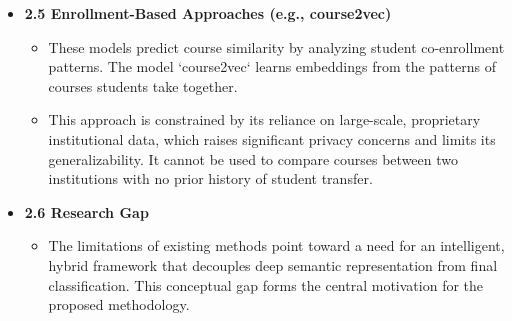 \documentclass[11pt]{article}
\begin{document}
\begin{itemize}
\begin{itemize}
    \end{itemize}
    \item \textbf{2.5 Enrollment-Based Approaches (e.g., course2vec)}
    \begin{itemize}
        \item These models predict course similarity by analyzing student co-enrollment patterns. The model `course2vec` learns embeddings from the patterns of courses students take together.
        \item This approach is constrained by its reliance on large-scale, proprietary institutional data, which raises significant privacy concerns and limits its generalizability. It cannot be used to compare courses between two institutions with no prior history of student transfer.
    \end{itemize}
    \item \textbf{2.6 Research Gap}
    \begin{itemize}
        \item The limitations of existing methods point toward a need for an intelligent, hybrid framework that decouples deep semantic representation from final classification. This conceptual gap forms the central motivation for the proposed methodology.
    \end{itemize}
\end{itemize}
\end{document}
